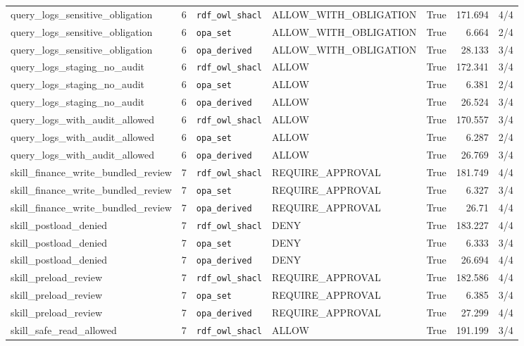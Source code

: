 \begin{table}[h!]
\begin{tabular}{l c l l c r c}
query\_logs\_sensitive\_obligation & 6 & \texttt{rdf\_owl\_shacl} & ALLOW_WITH_OBLIGATION & True & 171.694 & 4/4 \\
query\_logs\_sensitive\_obligation & 6 & \texttt{opa\_set} & ALLOW_WITH_OBLIGATION & True & 6.664 & 2/4 \\
query\_logs\_sensitive\_obligation & 6 & \texttt{opa\_derived} & ALLOW_WITH_OBLIGATION & True & 28.133 & 3/4 \\
query\_logs\_staging\_no\_audit & 6 & \texttt{rdf\_owl\_shacl} & ALLOW & True & 172.341 & 3/4 \\
query\_logs\_staging\_no\_audit & 6 & \texttt{opa\_set} & ALLOW & True & 6.381 & 2/4 \\
query\_logs\_staging\_no\_audit & 6 & \texttt{opa\_derived} & ALLOW & True & 26.524 & 3/4 \\
query\_logs\_with\_audit\_allowed & 6 & \texttt{rdf\_owl\_shacl} & ALLOW & True & 170.557 & 3/4 \\
query\_logs\_with\_audit\_allowed & 6 & \texttt{opa\_set} & ALLOW & True & 6.287 & 2/4 \\
query\_logs\_with\_audit\_allowed & 6 & \texttt{opa\_derived} & ALLOW & True & 26.769 & 3/4 \\
skill\_finance\_write\_bundled\_review & 7 & \texttt{rdf\_owl\_shacl} & REQUIRE_APPROVAL & True & 181.749 & 4/4 \\
skill\_finance\_write\_bundled\_review & 7 & \texttt{opa\_set} & REQUIRE_APPROVAL & True & 6.327 & 3/4 \\
skill\_finance\_write\_bundled\_review & 7 & \texttt{opa\_derived} & REQUIRE_APPROVAL & True & 26.71 & 4/4 \\
skill\_postload\_denied & 7 & \texttt{rdf\_owl\_shacl} & DENY & True & 183.227 & 4/4 \\
skill\_postload\_denied & 7 & \texttt{opa\_set} & DENY & True & 6.333 & 3/4 \\
skill\_postload\_denied & 7 & \texttt{opa\_derived} & DENY & True & 26.694 & 4/4 \\
skill\_preload\_review & 7 & \texttt{rdf\_owl\_shacl} & REQUIRE_APPROVAL & True & 182.586 & 4/4 \\
skill\_preload\_review & 7 & \texttt{opa\_set} & REQUIRE_APPROVAL & True & 6.385 & 3/4 \\
skill\_preload\_review & 7 & \texttt{opa\_derived} & REQUIRE_APPROVAL & True & 27.299 & 4/4 \\
skill\_safe\_read\_allowed & 7 & \texttt{rdf\_owl\_shacl} & ALLOW & True & 191.199 & 3/4 \\

\end{tabular}
\end{table}
